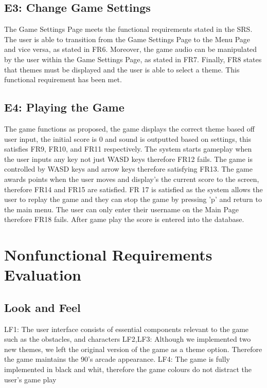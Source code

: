 \documentclass[12pt, titlepage]{article}
\begin{document}
\subsection{E3: Change Game Settings}
The Game Settings Page meets the functional requirements stated in the SRS. The user is able to transition from the Game Settings Page to the Menu Page and vice versa, as stated in FR6. Moreover, the game audio can be manipulated by the user within the Game Settings Page, as stated in FR7. Finally, FR8 states that themes must be displayed and the user is able to select a theme. This functional requirement has been met.

\subsection{E4: Playing the Game}
The game functions as proposed, the game displays the correct theme based off user input, the initial score is 0 and sound is outputted based on settings, this satisfies FR9, FR10, and FR11 respectively. The system starts gameplay when the user inputs any key not just WASD keys therefore FR12 fails. The game is controlled by WASD keys and arrow keys therefore satisfying FR13. The game awards points when the user moves and display's the current score to the screen, therefore FR14 and FR15 are satisfied. FR 17 is satisfied as the system allows the user to replay the game and they can stop the game by pressing 'p' and return to the main menu. The user can only enter their username on the Main Page therefore FR18 fails. After game play the score is entered into the database. 


\section{Nonfunctional Requirements Evaluation}
\subsection{Look and Feel}	
LF1: The user interface consists of essential components relevant to the game such as the obstacles, and characters
LF2,LF3: Although we implemented two new themes, we left the original version of the game as a theme option. Therefore the game maintains the 90's arcade appearance.
LF4: The game is fully implemented in black and whit, therefore the  game colours do not distract the user's game play
\end{document}
